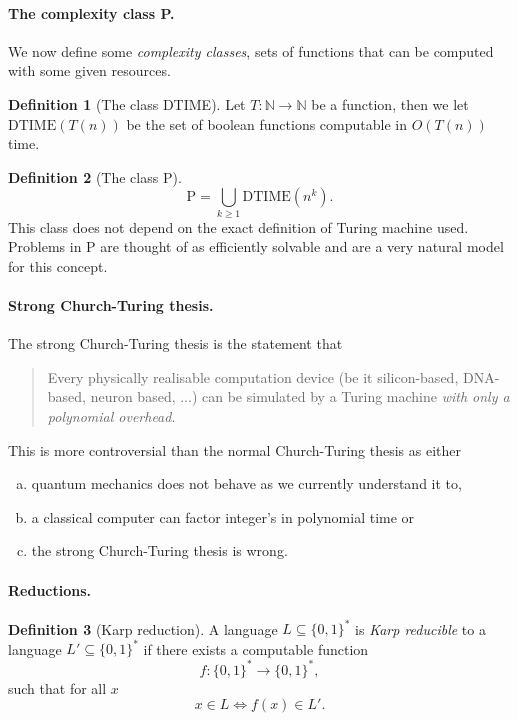\documentclass[11pt,a4paper]{article}
\theoremstyle{definition}
\newtheorem{defn}{Definition}
\newcommand{\NN}{\mathbb{N}}
\begin{document}
\paragraph{The complexity class P.}
We now define some \emph{complexity classes}, sets of functions that can be computed with some given resources.
\begin{defn}[The class DTIME]
Let $T\colon \NN\to\NN$ be a function, then we let $\text{DTIME}(T(n))$ be the set of boolean functions computable in $O(T(n))$ time.
\end{defn}
\begin{defn}[The class P]
\[
\text{P} = \bigcup_{k\ge 1} \text{DTIME}(n^k).
\]
This class does not depend on the exact definition of Turing machine used.
Problems in P are thought of as efficiently solvable and are a very natural model for this concept.
\end{defn}

\paragraph{Strong Church-Turing thesis.}
The strong Church-Turing thesis is the statement that
\begin{quote}
Every physically realisable computation device (be it silicon-based, DNA-based, neuron based, ...) can be simulated by a Turing machine \emph{with only a polynomial overhead}.
\end{quote}
This is more controversial than the normal Church-Turing thesis as either
\begin{enumerate}[a)]
\item quantum mechanics does not behave as we currently understand it to,
\item a classical computer can factor integer's in polynomial time or
\item the strong Church-Turing thesis is wrong.
\end{enumerate}

\paragraph{Reductions.}
\begin{defn}[Karp reduction]
A language $L\subseteq\{0,1\}^*$ is \emph{Karp reducible} to a language $L'\subseteq \{0,1\}^*$ if there exists a computable function 
\[
f\colon \{0,1\}^* \to \{0,1\}^*,
\]
such that for all $x$ 
\[
x\in L \iff f(x) \in L'.
\]
\end{defn}
\end{document}
